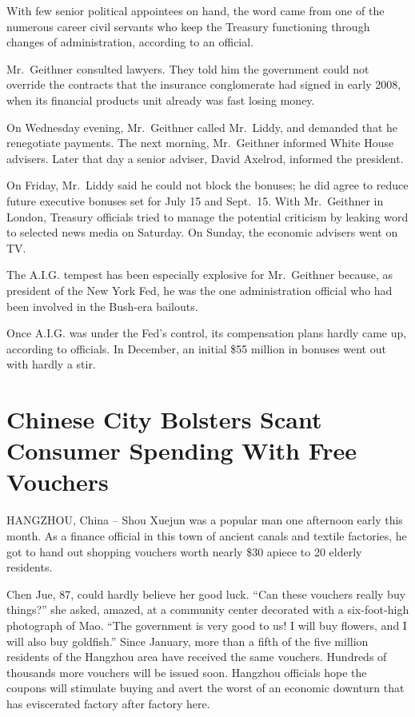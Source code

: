 \documentclass[12pt,a4paper,onecolumn]{article}
\begin{document}
\begin{CJK*}{GBK}{song}
With few senior political appointees on hand, the word came from one of the numerous career civil
servants who keep the Treasury functioning through changes of administration, according to an
official.

Mr.~Geithner consulted lawyers. They told him the government could not override the contracts that
the insurance conglomerate had signed in early 2008, when its financial products unit already was
fast losing money.

On Wednesday evening, Mr.~Geithner called Mr.~Liddy, and demanded that he renegotiate payments. The
next morning, Mr.~Geithner informed White House advisers. Later that day a senior adviser, David
Axelrod, informed the president.

On Friday, Mr.~Liddy said he could not block the bonuses; he did agree to reduce future executive
bonuses set for July 15 and Sept.~15. With Mr.~Geithner in London, Treasury officials tried to
manage the potential criticism by leaking word to selected news media on Saturday. On Sunday, the
economic advisers went on TV.

The A.I.G. tempest has been especially explosive for Mr.~Geithner because, as president of the New
York Fed, he was the one administration official who had been involved in the Bush-era bailouts.

Once A.I.G. was under the Fed's control, its compensation plans hardly came up, according to
officials. In December, an initial \$55 million in bonuses went out with hardly a stir.

\section{Chinese City Bolsters Scant Consumer Spending With Free Vouchers}

HANGZHOU, China -- Shou Xuejun was a popular man one afternoon early this month. As a finance
official in this town of ancient canals and textile factories, he got to hand out shopping vouchers
worth nearly \$30 apiece to 20 elderly residents.

Chen Jue, 87, could hardly believe her good luck. ``Can these vouchers really buy things?'' she
asked, amazed, at a community center decorated with a six-foot-high photograph of Mao. ``The
government is very good to us! I will buy flowers, and I will also buy goldfish.'' Since January,
more than a fifth of the five million residents of the Hangzhou area have received the same
vouchers. Hundreds of thousands more vouchers will be issued soon. Hangzhou officials hope the
coupons will stimulate buying and avert the worst of an economic downturn that has eviscerated
factory after factory here.


\end{CJK*}
\end{document}
